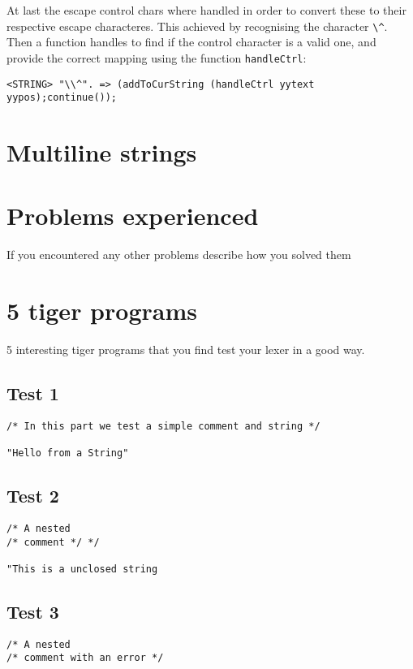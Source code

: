 \documentclass{article}
\begin{document}
At last the escape control chars where handled in order to convert these to their respective escape characteres. This achieved by recognising the character \texttt{\textbackslash \^}. Then a function handles to find if the control character is a valid one, and provide the correct mapping using the function \texttt{handleCtrl}:

\begin{lstlisting}[frame=single]
<STRING> "\\^". => (addToCurString (handleCtrl yytext yypos);continue());
\end{lstlisting}

\section{Multiline strings}


\section{Problems experienced}
If you encountered any other problems describe how you solved them

\section{5 tiger programs}
5 interesting tiger programs that you find test your lexer in a good way.

\subsection{Test 1}
\begin{lstlisting}[frame=single]
/* In this part we test a simple comment and string */

"Hello from a String"
\end{lstlisting}


\subsection{Test 2}
\begin{lstlisting}[frame=single]
/* A nested
/* comment */ */

"This is a unclosed string
\end{lstlisting}

\subsection{Test 3}
\begin{lstlisting}[frame=single]
/* A nested
/* comment with an error */ 

\end{lstlisting}
\end{document}
